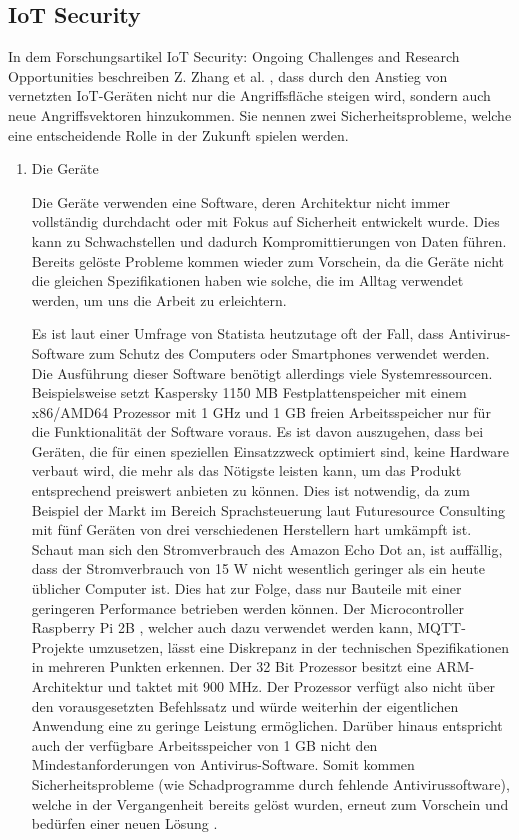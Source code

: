         \subsection{\ac{IoT} Security}
        In dem Forschungsartikel \glqq IoT Security: Ongoing Challenges and Research Opportunities\grqq{} beschreiben Z. Zhang et al. \cite{6978614}, dass durch den Anstieg von vernetzten \ac{IoT}-Geräten nicht nur die Angriffsfläche steigen wird, sondern auch neue Angriffsvektoren hinzukommen.
        Sie nennen zwei Sicherheitsprobleme, welche eine entscheidende Rolle in der Zukunft spielen werden.
        \begin{enumerate}
            \item Die Geräte
            
            Die Geräte verwenden eine Software, deren Architektur nicht immer vollständig durchdacht oder mit Fokus auf Sicherheit entwickelt wurde. Dies kann zu Schwachstellen und dadurch Kompromittierungen von Daten führen. Bereits gelöste Probleme kommen wieder zum Vorschein, da die Geräte nicht die gleichen Spezifikationen haben wie solche, die im Alltag verwendet werden, um uns die Arbeit zu erleichtern. 
        
            Es ist laut einer Umfrage von Statista \cite{kaspersky_lab_2019}
            heutzutage oft der Fall, dass Antivirus-Software zum Schutz des Computers oder Smartphones verwendet werden. Die Ausführung dieser Software benötigt allerdings viele Systemressourcen.
            Beispielsweise setzt Kaspersky \cite{ao_kaspersky_lab_2018_1}
            1150 MB Festplattenspeicher mit einem x86/AMD64 Prozessor mit 1 GHz und 1 GB freien Arbeitsspeicher nur für die Funktionalität der Software voraus. Es ist davon auszugehen, dass bei Geräten, die für einen speziellen Einsatzzweck optimiert sind, keine Hardware verbaut wird, die mehr als das Nötigste leisten kann, um das Produkt entsprechend preiswert anbieten zu können. Dies ist notwendig, da zum Beispiel der Markt im Bereich Sprachsteuerung laut Futuresource Consulting \cite{futuresource_consulting_ltd_2019} mit fünf Geräten von drei verschiedenen Herstellern hart umkämpft ist. Schaut man sich den Stromverbrauch des Amazon Echo Dot \cite{amazon_de_alle_produkte_2018} an, ist auffällig, dass der Stromverbrauch von 15 W nicht wesentlich geringer als ein heute üblicher Computer ist. Dies hat zur Folge, dass nur Bauteile mit einer geringeren Performance betrieben werden können.
            Der Microcontroller Raspberry Pi 2B \cite{raspberry_pi_foundation_2016}, welcher auch dazu verwendet werden kann, \ac{MQTT}-Projekte umzusetzen, lässt eine Diskrepanz in der technischen Spezifikationen in mehreren Punkten erkennen. Der 32 Bit Prozessor besitzt eine \ac{ARM}-Architektur und taktet mit 900 MHz. Der Prozessor verfügt also nicht über den vorausgesetzten Befehlssatz und würde weiterhin der eigentlichen Anwendung eine zu geringe Leistung ermöglichen. Darüber hinaus entspricht auch der verfügbare Arbeitsspeicher von 1 GB nicht den Mindestanforderungen von Antivirus-Software.
            Somit kommen Sicherheitsprobleme (wie Schadprogramme durch fehlende Antivirussoftware), welche in der Vergangenheit bereits gelöst wurden, erneut zum Vorschein und bedürfen einer neuen Lösung \cite{6978614}.
            

\end{enumerate}
